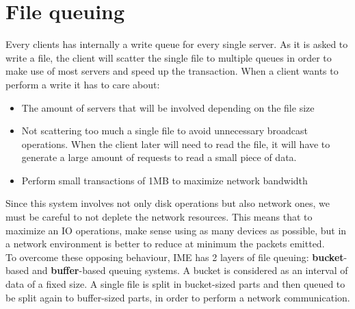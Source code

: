 \section{File queuing}
Every clients has internally a write queue for every single server. As it is
asked to write a file, the client will scatter the single file to multiple
queues in order to make use of most servers and speed up the transaction.
When a client wants to perform a write it has to care about:
\begin{itemize}
    \item The amount of servers that will be involved depending on the file size
    \item Not scattering too much a single file to avoid unnecessary broadcast
        operations. When the client later will need to read the file, it will
        have to generate a large amount of requests to read a small piece of data.
    \item Perform small transactions of 1MB to maximize network bandwidth
\end{itemize}
Since this system involves not only disk operations but also network ones, we
must be careful to not deplete the network resources. This means that to
maximize an IO operations, make sense using as many devices as possible, but in
a network environment is better to reduce at minimum the packets emitted. \\ To
overcome these opposing behaviour, IME has 2 layers of file queuing:
\textbf{bucket}-based and \textbf{buffer}-based queuing systems.  A bucket is
considered as an interval of data of a fixed size. A single file is split in
bucket-sized parts and then queued to be split again to buffer-sized parts, in
order to perform a network communication.

